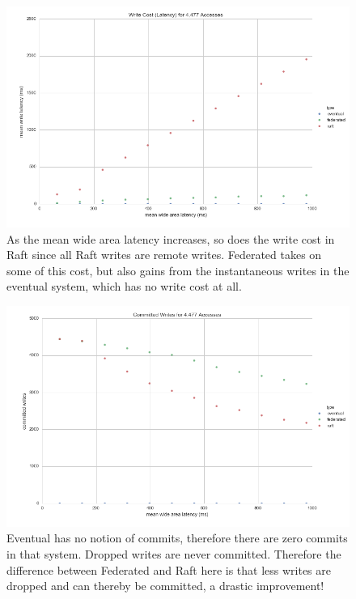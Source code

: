 \documentclass[11pt,letterpaper]{article}
\begin{document}
\begin{figure}[!h]
    \centering
        \includegraphics[width=\textwidth]{figures/write_latency.png}
        \caption{\textsf{As the mean wide area latency increases, so does the write cost in Raft since all Raft writes are remote writes. Federated takes on some of this cost, but also gains from the instantaneous writes in the eventual system, which has no write cost at all.}}
        \label{fig:write_latency}
\end{figure}


\begin{figure}[!h]
    \centering
        \includegraphics[width=\textwidth]{figures/committed_writes.png}
        \caption{\textsf{Eventual has no notion of commits, therefore there are zero commits in that system. Dropped writes are never committed. Therefore the difference between Federated and Raft here is that less writes are dropped and can thereby be committed, a drastic improvement!}}
        \label{fig:committed_writes}
\end{figure}
\end{document}
